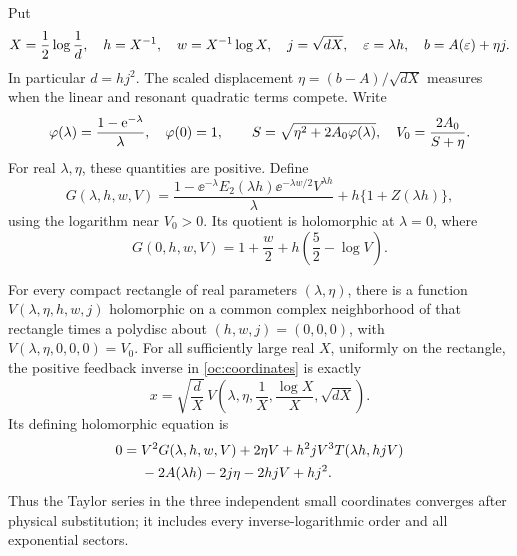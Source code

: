 Put
\begin{equation}\label{oc:coordinates}
 X=\frac12\log\frac1d,\quad
 h=X^{-1},\quad w=X^{-1}\log X,\quad j=\sqrt{dX},\quad
 \varepsilon=\lambda h,\quad b=A(\varepsilon)+\eta j.
\end{equation}
In particular $d=hj^2$. The scaled displacement
$\eta=(b-A)/\sqrt{dX}$ measures when the linear and resonant
quadratic terms compete. Write
\begin{equation}\label{oc:profile}
 \varphi(\lambda)=\frac{1-\mathrm e^{-\lambda}}\lambda,\quad \varphi(0)=1,
 \qquad
 S=\sqrt{\eta^2+2A_0\varphi(\lambda)},\quad
 V_0=\frac{2A_0}{S+\eta}.
\end{equation}
For real $\lambda,\eta$, these quantities are positive. Define
\begin{equation}\label{oc:G}
 G(\lambda,h,w,V)=
 \frac{1-\ee^{-\lambda}E_2(\lambda h)
           \ee^{-\lambda w/2}V^{\lambda h}}\lambda
       +h\{1+Z(\lambda h)\},
\end{equation}
using the logarithm near $V_0>0$. Its quotient is holomorphic at
$\lambda=0$, where
\begin{equation}\label{oc:G-zero}
 G(0,h,w,V)=1+\frac w2+h\left(\frac52-\log V\right).
\end{equation}

\begin{theorem}\label{thm:joint-crossover}
For every compact rectangle of real parameters $(\lambda,\eta)$,
there is a function $V(\lambda,\eta,h,w,j)$ holomorphic on a common
complex neighborhood of that rectangle times a polydisc about
$(h,w,j)=(0,0,0)$, with $V(\lambda,\eta,0,0,0)=V_0$.
For all sufficiently large real $X$, uniformly on the rectangle,
the positive feedback inverse in \eqref{oc:coordinates} is exactly
\begin{equation}\label{oc:joint-chart}
 \boxed{\displaystyle
 x=\sqrt{\frac dX}\,
 V\left(\lambda,\eta,\frac1X,\frac{\log X}{X},\sqrt{dX}\right).}
\end{equation}
Its defining holomorphic equation is
\begin{align}
 0={}&V^2G(\lambda,h,w,V)+2\eta V
      +h^2jV^3T(\lambda h,hjV)\notag\\
    &-2A(\lambda h)-2j\eta-2hjV+hj^2.
       \label{oc:joint-implicit}
\end{align}
Thus the Taylor series in the three independent small coordinates
converges after physical substitution; it includes every
inverse-logarithmic order and all exponential sectors.
\end{theorem}

